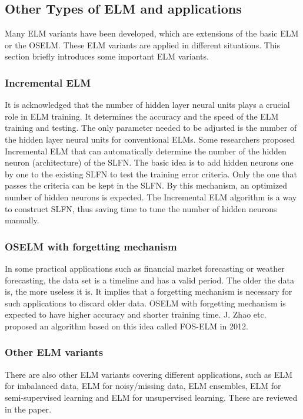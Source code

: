 \documentclass[a4paper, 14pt]{extarticle}
\begin{document}
\subsection{Other Types of ELM and applications}
\par Many ELM variants have been developed, which are extensions of the basic ELM or the OSELM. These ELM variants are applied in different situations. This section briefly introduces some important ELM variants. 
\subsubsection{Incremental ELM}
\par It is acknowledged that the number of hidden layer neural units plays a crucial role in ELM training. It determines the accuracy and the speed of the ELM training and testing. The only parameter needed to be adjusted is the number of the hidden layer neural units for conventional ELMs. Some researchers proposed Incremental ELM that can automatically determine the number of the hidden neuron (architecture) of the SLFN\cite{huang2006universal}\cite{huang2007convex}\cite{zhang2011extreme}. The basic idea is to add hidden neurons one by one to the existing SLFN to test the training error criteria. Only the one that passes the criteria can be kept in the SLFN. By this mechanism, an optimized number of hidden neurons is expected. The Incremental ELM algorithm is a way to construct SLFN, thus saving time to tune the number of hidden neurons manually. 
\subsubsection{OSELM with forgetting mechanism}
\par In some practical applications such as financial market forecasting or weather forecasting,  the data set is a timeline and has a valid period. The older the data is, the more useless it is. It implies that a forgetting mechanism is necessary for such applications to discard older data. OSELM with forgetting mechanism is expected to have higher accuracy and shorter training time. J. Zhao etc. proposed an algorithm based on this idea called FOS-ELM in 2012\cite{zhao2012online}. 
\subsubsection{Other ELM variants}
There are also other ELM variants covering different applications, such as ELM for imbalanced data\cite{HORATA201331}\cite{Zhou2012SurfaceRB}, ELM for noisy/missing data\cite{HORATA201331}\cite{MAN20112491}, ELM ensembles, ELM for semi-supervised learning and ELM for unsupervised learning. These are reviewed in the paper\cite{huang2015trends}.
\end{document}
